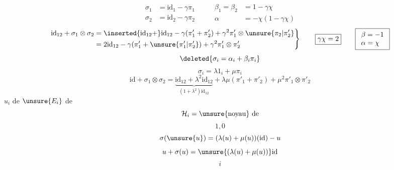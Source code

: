 \[
\begin{aligned}
\sigma_1&=\mathrm{id}_1-\gamma\pi_1\\
\sigma_2&=\mathrm{id}_2-\gamma\pi_2
\end{aligned}
\qquad\begin{aligned}
\beta_1=\beta_2&=1-\gamma\chi\\
\alpha&=-\chi(1-\gamma\chi)
\end{aligned}
\]
\[
\left.\begin{aligned}
\mathrm{id}_{12}+\sigma_1\otimes\sigma_2
&=\inserted{\mathrm{id}_{12}+}\mathrm{id}_{12}
-\gamma(\pi'_1+\pi'_2)+\gamma^2\pi'_1\otimes\unsure{\pi_2|\pi'_2}\\
&=2\mathrm{id}_{12}-\gamma(\pi'_1+\unsure{\pi'_1|\pi'_2})
+\gamma^2\pi'_1\otimes\pi'_2
\end{aligned}\right\}
\qquad\boxed{\gamma\chi=2}\qquad
\boxed{\begin{array}{l}\beta=-1\\\alpha=\chi\end{array}}
\]
\[
\deleted{\sigma_i=\alpha_i+\beta_i\pi_i}
\]
\[
\sigma_i=\lambda 1_i+\mu\pi_i
\]
\[
\mathrm{id}+\sigma_1\otimes\sigma_2
=\underbrace{\mathrm{id}_{12}+\lambda^2\mathrm{id}_{12}}_{(1+\lambda^2)\mathrm{id}_{12}}
+\lambda\mu(\pi'_1+\pi'_2)+\mu^2\pi'_1\otimes\pi'_2
\]
\(u_i\)  de \(\unsure{E_i}\)   de
\[
\mathcal H_i=\text{\unsure{noyau} de}
\]
\[
1,0
\]
\[
\sigma(\unsure{u})=(\lambda(u)+\mu(u))(\mathrm{id})-u
\]
\[
u+\sigma(u)=\unsure{(\lambda(u)+\mu(u))}\mathrm{id}
\]
\[
i
\]
